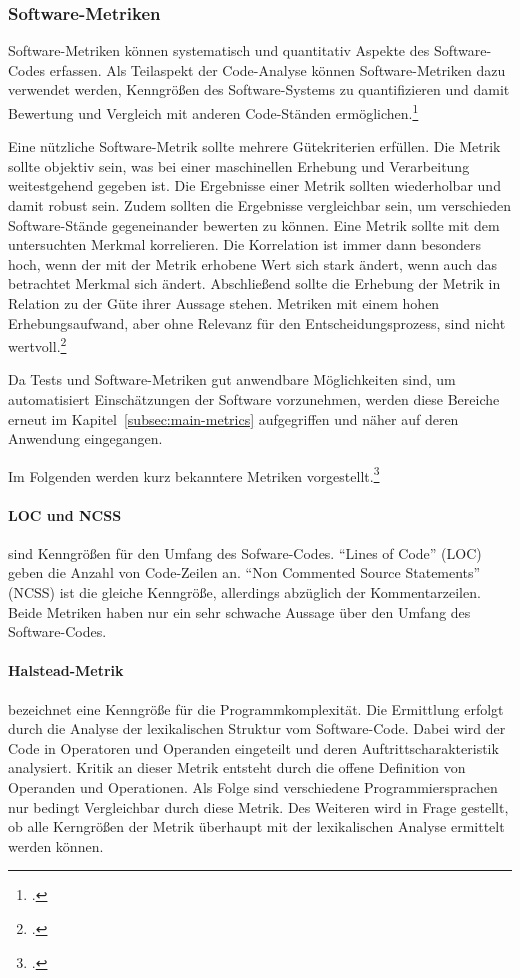 \subsubsection{Software-Metriken}
\label{subsubsec:base-metrics}
Software-Metriken können systematisch und quantitativ Aspekte des Software-Codes erfassen. Als Teilaspekt der Code-Analyse können Software-Metriken dazu verwendet werden, Kenngrößen des Software-Systems zu quantifizieren und damit Bewertung und Vergleich mit anderen Code-Ständen ermöglichen.\footcite[S.247][]{software-quality2008}

Eine nützliche Software-Metrik sollte mehrere Gütekriterien erfüllen. Die Metrik sollte objektiv sein, was bei einer maschinellen Erhebung und Verarbeitung weitestgehend gegeben ist. Die Ergebnisse einer Metrik sollten wiederholbar und damit robust sein. Zudem sollten die Ergebnisse vergleichbar sein, um verschieden Software-Stände gegeneinander bewerten zu können. Eine Metrik sollte mit dem untersuchten Merkmal korrelieren. Die Korrelation ist immer dann besonders hoch, wenn der mit der Metrik erhobene Wert sich stark ändert, wenn auch das betrachtet Merkmal sich ändert. Abschließend sollte die Erhebung der Metrik in Relation zu der Güte ihrer Aussage stehen. Metriken mit einem hohen Erhebungsaufwand, aber ohne Relevanz für den Entscheidungsprozess, sind nicht wertvoll.\footcite[S.248 ff][]{software-quality2008}

Da Tests und Software-Metriken gut anwendbare Möglichkeiten sind, um automatisiert Einschätzungen der Software vorzunehmen, werden diese Bereiche erneut im Kapitel~\ref{subsec:main-metrics} aufgegriffen und näher auf deren Anwendung eingegangen.

Im Folgenden werden kurz bekanntere Metriken vorgestellt.\footcite[S.249 ff][]{software-quality2008}

\paragraph{LOC und NCSS} sind Kenngrößen für den Umfang des Sofware-Codes. ``Lines of Code'' (LOC) geben die Anzahl von Code-Zeilen an. ``Non Commented Source Statements'' (NCSS) ist die gleiche Kenngröße, allerdings abzüglich der Kommentarzeilen. Beide Metriken haben nur ein sehr schwache Aussage über den Umfang des Software-Codes.

\paragraph{Halstead-Metrik} bezeichnet eine Kenngröße für die Programmkomplexität. Die Ermittlung erfolgt durch die Analyse der lexikalischen Struktur vom Software-Code. Dabei wird der Code in Operatoren und Operanden eingeteilt und deren Auftrittscharakteristik analysiert. Kritik an dieser Metrik entsteht durch die offene Definition von Operanden und Operationen. Als Folge sind verschiedene Programmiersprachen nur bedingt Vergleichbar durch diese Metrik. Des Weiteren wird in Frage gestellt, ob alle Kerngrößen der Metrik überhaupt mit der lexikalischen Analyse ermittelt werden können.

